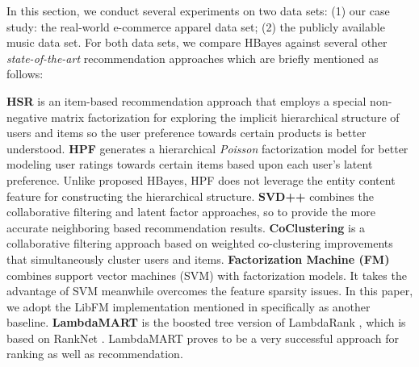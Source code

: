 In this section, we conduct several experiments on two data sets: (1) our case study: the real-world e-commerce apparel data set; (2) the publicly available music data set.  For both data sets, we compare HBayes against several other \emph{state-of-the-art} recommendation approaches which are briefly mentioned as follows:

{\noindent\textbf{HSR} \cite{wang2015exploring} is an item-based recommendation approach that employs a special non-negative matrix factorization for exploring the implicit hierarchical structure of users and items so the user preference towards certain products is better understood.  \newline %
\textbf{HPF} \cite{gopalan2015scalable} generates a hierarchical \emph{Poisson} factorization model for better modeling user ratings towards certain items based upon each user's latent preference.  Unlike proposed HBayes, HPF does not leverage the entity content feature for constructing the hierarchical structure.  \newline %
\textbf{SVD++} \cite{mnih2008probabilistic, koren2008factorization} combines the collaborative filtering and latent factor approaches, so to provide the more accurate neighboring based recommendation results.  \newline %
\textbf{CoClustering} \cite{george2005scalable} is a collaborative filtering approach based on weighted co-clustering improvements that simultaneously cluster users and items.  \newline %
\textbf{Factorization Machine (FM)} \cite{rendle2010factorization,rendle2012factorization} combines support vector machines (SVM) with factorization models.  It takes the advantage of SVM meanwhile overcomes the feature sparsity issues.  In this paper, we adopt the LibFM implementation mentioned in \cite{rendle2012factorization} specifically as another baseline. \newline
\textbf{LambdaMART} \cite{burges2010ranknet} is the boosted tree version of LambdaRank \cite{donmez2009local}, which is based on RankNet \cite{burges2005learning}.  LambdaMART proves to be a very successful approach for ranking as well as recommendation.  %

}
